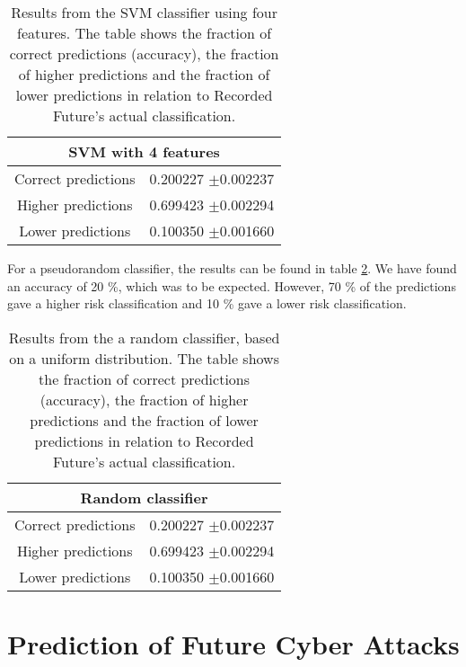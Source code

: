 \begin{table}[h!]
    \centering
    \caption{Results from the SVM classifier using four features. The table shows the fraction of correct predictions (accuracy), the fraction of higher predictions and the fraction of lower predictions in relation to Recorded Future's actual classification.}
    \begin{tabular}{|c|c|}
    \hline
        \multicolumn{2}{|c|}{SVM with 4 features}\\ \hline
        Correct predictions & 0.200227 $\pm$0.002237 \\
        Higher predictions  & 0.699423 $\pm$0.002294\\
        Lower predictions   & 0.100350 $\pm$0.001660\\ \hline
    \end{tabular}
    \label{IpRes4Feat}
\end{table}

For a pseudorandom classifier, the results can be found in table \ref{randClass}. We have found an accuracy of 20 \%, which was to be expected. However, 70 \% of the predictions gave a higher risk classification and 10 \% gave a lower risk classification.

\begin{table}[h!]
    \centering
    \caption{Results from the a random classifier, based on a uniform distribution. The table shows the fraction of correct predictions (accuracy), the fraction of higher predictions and the fraction of lower predictions in relation to Recorded Future's actual classification.}
    \begin{tabular}{|c|c|}
    \hline
        \multicolumn{2}{|c|}{Random classifier}\\ \hline
        Correct predictions & 0.200227 $\pm$0.002237 \\
        Higher predictions  & 0.699423 $\pm$0.002294\\
        Lower predictions   & 0.100350 $\pm$0.001660\\ \hline
    \end{tabular}
    \label{randClass}
\end{table}

\FloatBarrier
\section{Prediction of Future Cyber Attacks}

